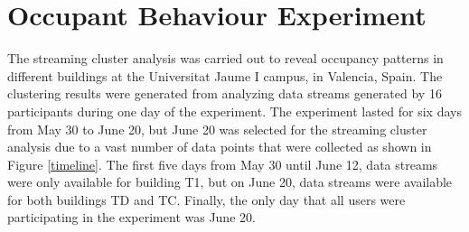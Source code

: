 




\section{Occupant Behaviour Experiment}
The streaming cluster analysis was carried out to reveal occupancy patterns in different buildings at the Universitat Jaume I campus, in Valencia, Spain. The clustering results were generated from analyzing data streams generated by 16 participants during one day of the experiment. The experiment lasted for six days from May 30 to June 20, but June 20 was selected for the streaming cluster analysis due to a vast number of data points that were collected as shown in Figure \ref{timeline}. The first five days from May 30 until June 12, data streams were only available for building T1, but on June 20, data streams were available for both buildings TD and TC. Finally, the only day that all users were participating in the experiment was June 20.

